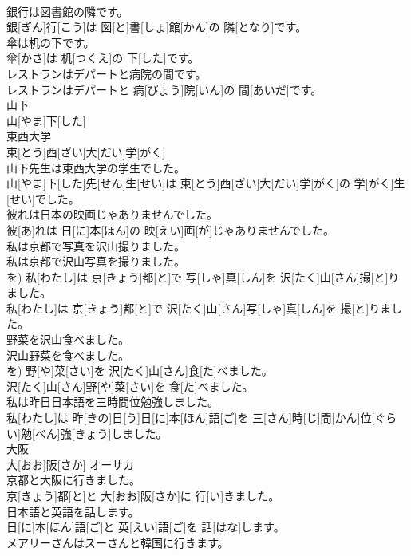 \documentclass[8pt]{extreport}
\begin{document}
\begin{CJK}{UTF8}{min}
\\	銀行は図書館の隣です。	
\\	銀[ぎん]行[こう]は 図[と]書[しょ]館[かん]の 隣[となり]です。
\\	傘は机の下です。	
\\	傘[かさ]は 机[つくえ]の 下[した]です。
\\	レストランはデパートと病院の間です。	
\\	レストランはデパートと 病[びょう]院[いん]の 間[あいだ]です。
\\	山下	
\\	山[やま]下[した]	
\\	東西大学	
\\	東[とう]西[ざい]大[だい]学[がく]	
\\	山下先生は東西大学の学生でした。	
\\	山[やま]下[した]先[せん]生[せい]は 東[とう]西[ざい]大[だい]学[がく]の 学[がく]生[せい]でした。
\\	彼れは日本の映画じゃありませんでした。	
\\	彼[あ]れは 日[に]本[ほん]の 映[えい]画[が]じゃありませんでした。
\\	私は京都で写真を沢山撮りました。 
\\	私は京都で沢山写真を撮りました。	
\\	を)	私[わたし]は 京[きょう]都[と]で 写[しゃ]真[しん]を 沢[たく]山[さん]撮[と]りました。 
\\	私[わたし]は 京[きょう]都[と]で 沢[たく]山[さん]写[しゃ]真[しん]を 撮[と]りました。
\\	野菜を沢山食べました。 
\\	沢山野菜を食べました。	
\\	を)	野[や]菜[さい]を 沢[たく]山[さん]食[た]べました。 
\\	沢[たく]山[さん]野[や]菜[さい]を 食[た]べました。
\\	私は昨日日本語を三時間位勉強しました。	
\\	私[わたし]は 昨[きの]日[う]日[に]本[ほん]語[ご]を 三[さん]時[じ]間[かん]位[ぐらい]勉[べん]強[きょう]しました。
\\	大阪	
\\	大[おお]阪[さか]	オーサカ
\\	京都と大阪に行きました。	
\\	京[きょう]都[と]と 大[おお]阪[さか]に 行[い]きました。
\\	日本語と英語を話します。	
\\	日[に]本[ほん]語[ご]と 英[えい]語[ご]を 話[はな]します。
\\	メアリーさんはスーさんと韓国に行きます。	

\end{CJK}
\end{document}
